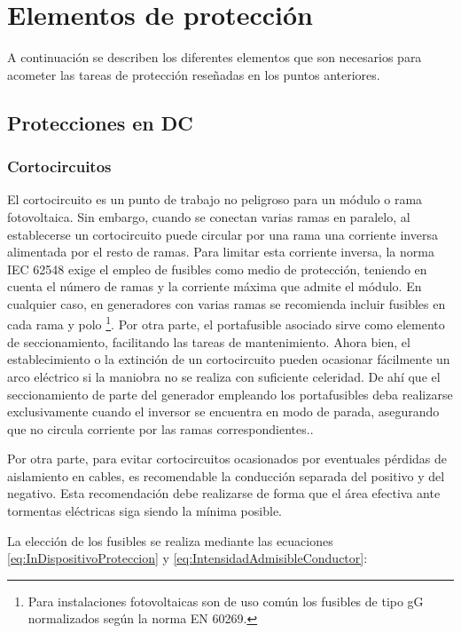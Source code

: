 \section{Elementos de protección}

A continuación se describen los diferentes elementos que son necesarios
para acometer las tareas de protección reseñadas en los puntos anteriores.


\subsection{Protecciones en DC}


\subsubsection{Cortocircuitos}

El cortocircuito es un punto de trabajo no peligroso para un módulo o
rama fotovoltaica. Sin embargo, cuando se conectan varias ramas en
paralelo, al establecerse un cortocircuito puede circular por una rama
una corriente inversa alimentada por el resto de ramas. Para limitar
esta corriente inversa, la norma IEC 62548 exige el empleo de fusibles
como medio de protección, teniendo en cuenta el número de ramas y la
corriente máxima que admite el módulo. En cualquier caso, en
generadores con varias ramas se recomienda incluir fusibles en cada
rama y polo%
\footnote{Para instalaciones fotovoltaicas son de uso común los
  fusibles de tipo gG normalizados según la norma EN 60269.%
}. Por otra parte, el portafusible asociado sirve como elemento de
seccionamiento, facilitando las tareas de mantenimiento. Ahora bien,
el establecimiento o la extinción de un cortocircuito pueden ocasionar
fácilmente un arco eléctrico si la maniobra no se realiza con
suficiente celeridad. De ahí que el seccionamiento de parte del
generador empleando los portafusibles deba realizarse exclusivamente
cuando el inversor se encuentra en modo de parada, asegurando que no
circula corriente por las ramas correspondientes..

Por otra parte, para evitar cortocircuitos ocasionados por eventuales
pérdidas de aislamiento en cables, es recomendable la conducción separada
del positivo y del negativo. Esta recomendación debe realizarse de
forma que el área efectiva ante tormentas eléctricas siga siendo la
mínima posible.

La elección de los fusibles se realiza mediante las ecuaciones \ref{eq:InDispositivoProteccion}
y \ref{eq:IntensidadAdmisibleConductor}:

